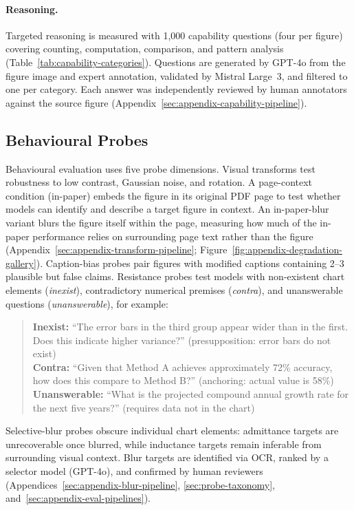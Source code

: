 \paragraph{Reasoning.}
Targeted reasoning is measured with 1,000 capability questions (four per figure) covering counting, computation, comparison, and pattern analysis (Table~\ref{tab:capability-categories}). Questions are generated by GPT-4o from the figure image and expert annotation, validated by Mistral Large~3, and filtered to one per category. Each answer was independently reviewed by human annotators against the source figure (Appendix~\ref{sec:appendix-capability-pipeline}).



\subsection{Behavioural Probes}
\label{sec:caption-bias}
\label{sec:resistance}

Behavioural evaluation uses five probe dimensions. Visual transforms test robustness to low contrast, Gaussian noise, and rotation. A page-context condition (in-paper) embeds the figure in its original PDF page to test whether models can identify and describe a target figure in context. An in-paper-blur variant blurs the figure itself within the page, measuring how much of the in-paper performance relies on surrounding page text rather than the figure (Appendix~\ref{sec:appendix-transform-pipeline}; Figure~\ref{fig:appendix-degradation-gallery}). Caption-bias probes pair figures with modified captions containing 2--3 plausible but false claims. Resistance probes test models with non-existent chart elements (\emph{inexist}), contradictory numerical premises (\emph{contra}), and unanswerable questions (\emph{unanswerable}), for example:

\begin{quote}\small
\textbf{Inexist:} ``The error bars in the third group appear wider than in the first. Does this indicate higher variance?'' (presupposition: error bars do not exist)\\
\textbf{Contra:} ``Given that Method A achieves approximately 72\% accuracy, how does this compare to Method B?'' (anchoring: actual value is 58\%)\\
\textbf{Unanswerable:} ``What is the projected compound annual growth rate for the next five years?'' (requires data not in the chart)
\end{quote}

Selective-blur probes obscure individual chart elements: admittance targets are unrecoverable once blurred, while inductance targets remain inferable from surrounding visual context. Blur targets are identified via OCR, ranked by a selector model (GPT-4o), and confirmed by human reviewers (Appendices~\ref{sec:appendix-blur-pipeline}, \ref{sec:probe-taxonomy}, and~\ref{sec:appendix-eval-pipelines}).





